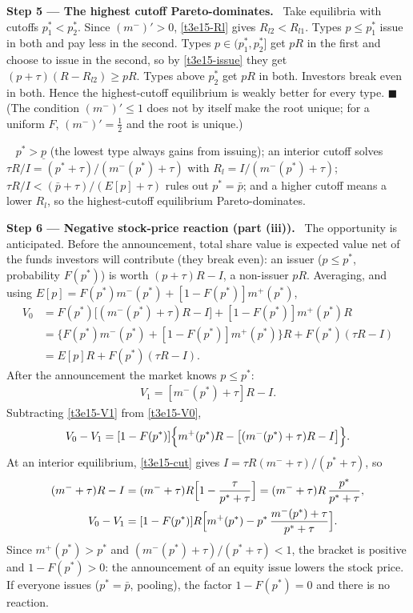 \documentclass[11pt,a4paper]{article}
\newcommand{\step}[2]{\par\medskip\noindent\textbf{Step #1 --- #2.}~}
\newcommand{\answer}[1]{\par\smallskip\noindent\fbox{\textbf{Answer #1.}}~}
\begin{document}
\step{5}{The highest cutoff Pareto-dominates} Take equilibria with cutoffs $p_1^*<p_2^*$. Since
$(m^-)'>0$, \eqref{t3e15-Rl} gives $R_{l2}<R_{l1}$. Types $p\le p_1^*$ issue in both and pay less in the
second. Types $p\in(p_1^*,p_2^*]$ get $pR$ in the first and choose to issue in the second, so by
\eqref{t3e15-issue} they get $(p+\tau)(R-R_{l2})\ge pR$. Types above $p_2^*$ get $pR$ in both. Investors
break even in both. Hence the highest-cutoff equilibrium is weakly better for every type. $\blacksquare$
(The condition $(m^-)'\le1$ does not by itself make the root unique; for a uniform $F$, $(m^-)'=\frac12$
and the root is unique.)

\answer{(ii)} $p^*>\underline p$ (the lowest type always gains from issuing); an interior cutoff solves $\tau R/I=(p^*+\tau)/(m^-(p^*)+\tau)$ with $R_l=I/(m^-(p^*)+\tau)$; $\tau R/I<(\bar p+\tau)/(E[p]+\tau)$ rules out $p^*=\bar p$; and a higher cutoff means a lower $R_l$, so the highest-cutoff equilibrium Pareto-dominates.

\step{6}{Negative stock-price reaction (part (iii))} The opportunity is anticipated. Before the
announcement, total share value is expected value net of the funds investors will contribute (they break
even): an issuer ($p\le p^*$, probability $F(p^*)$) is worth $(p+\tau)R-I$, a non-issuer $pR$. Averaging, and using $E[p]=F(p^*)m^-(p^*)+[1-F(p^*)]m^+(p^*)$,
\begin{align}
  V_0 &= F(p^*)\bigl[(m^-(p^*)+\tau)R-I\bigr]+[1-F(p^*)]m^+(p^*)R \label{t3e15-V0}\\
      &= \bigl\{F(p^*)m^-(p^*)+[1-F(p^*)]m^+(p^*)\bigr\}R+F(p^*)(\tau R-I) \nonumber\\
      &= E[p]R+F(p^*)(\tau R-I). \nonumber
\end{align}
After the announcement the market knows $p\le p^*$:
\begin{align}
  V_1 = [m^-(p^*)+\tau]R-I. \label{t3e15-V1}
\end{align}
Subtracting \eqref{t3e15-V1} from \eqref{t3e15-V0},
\begin{align}
  V_0-V_1 = [1-F(p^*)]\Bigl\{m^+(p^*)R-\bigl[(m^-(p^*)+\tau)R-I\bigr]\Bigr\}. \label{t3e15-dV}
\end{align}
At an interior equilibrium, \eqref{t3e15-cut} gives $I=\tau R(m^-+\tau)/(p^*+\tau)$, so
\begin{align}
  (m^-+\tau)R-I &= (m^-+\tau)R\Bigl[1-\frac{\tau}{p^*+\tau}\Bigr] = (m^-+\tau)R\,\frac{p^*}{p^*+\tau}, \nonumber\\
  V_0-V_1 &= [1-F(p^*)]R\Bigl[m^+(p^*)-p^*\,\frac{m^-(p^*)+\tau}{p^*+\tau}\Bigr]. \label{t3e15-dV2}
\end{align}
Since $m^+(p^*)>p^*$ and $(m^-(p^*)+\tau)/(p^*+\tau)<1$, the bracket is positive and $1-F(p^*)>0$: the
announcement of an equity issue lowers the stock price. If everyone issues ($p^*=\bar p$, pooling), the
factor $1-F(p^*)=0$ and there is no reaction.
\end{document}
